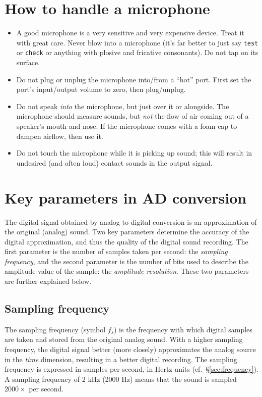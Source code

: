 \documentclass[
]{book}
\begin{document}
\protect{}\label{mic-howto}
\section{How to handle a microphone}\label{sec:microphone}

\begin{itemize}
\item
  A good microphone is a very sensitive and very expensive device. Treat it with great care. Never blow into a microphone (it's far better to just say \texttt{test} or \texttt{check} or anything with plosive and fricative consonants). Do not tap on its surface.
\item
  Do not plug or unplug the microphone into/from a ``hot'' port. First set the port's input/output volume to zero, then plug/unplug.
\item
  Do not speak \emph{into} the microphone, but just over it or alongside. The microphone should measure sounds, but \emph{not} the flow of air coming out of a speaker's mouth and nose. If the microphone comes with a foam cap to dampen airflow, then use it.
\item
  Do not touch the microphone while it is picking up sound; this will result in undesired (and often loud) contact sounds in the output signal.
\end{itemize}

\section{Key parameters in AD conversion}\label{key-parameters-in-ad-conversion}

The digital signal obtained by analog-to-digital conversion is an approximation of the original (analog) sound. Two key parameters determine the accuracy of the digital approximation, and thus the quality of the digital sound recording. The first parameter is the number of samples taken per second: the \emph{sampling frequency}, and the second parameter is the number of bits used to describe the amplitude value of the sample: the \emph{amplitude resolution}. These two parameters are further explained below.

\subsection{Sampling frequency}\label{sec:samplingfrequency}

The sampling frequency (symbol \(f_s\)) is the frequency with which digital samples are taken and stored from the original analog sound. With a higher sampling frequency, the digital signal better (more closely) approximates the analog source in the \emph{time} dimension, resulting in a better digital recording. The sampling frequency is expressed in samples per second, in Hertz units (cf.~§\ref{sec:frequency}). A sampling frequency of 2 kHz (2000 Hz) means that the sound is sampled \(2000 \times\) per second.
\end{document}
